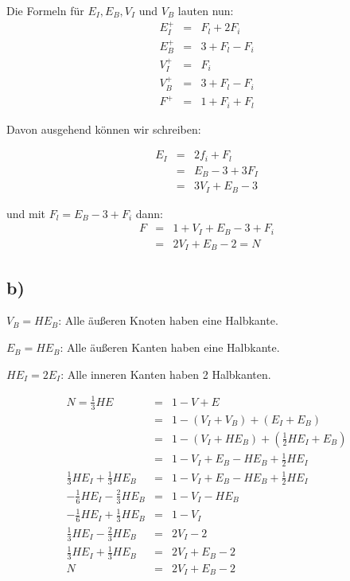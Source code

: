 Die Formeln für $E_I, E_B, V_I$ und $V_B$ lauten nun:
\begin{eqnarray}
E_{I}^+ &=& F_l + 2F_i \\
    E_{B}^+ &=& 3 + F_l - F_i  \\
    V_{I}^+ &=& F_i\\
    V_{B}^+ &=& 3 + F_l - F_i\\
    F^+ &=& 1 + F_i + F_l
\end{eqnarray}

Davon ausgehend können wir schreiben:

\begin{eqnarray}
    E_I&=& 2 f_i + F_l \\
    &=& E_B-3+3F_I \\
    &=& 3V_I + E_B-3
\end{eqnarray}

und mit $F_l = E_B - 3+F_i$ dann:
\begin{eqnarray}
    F &=& 1 + V_I + E_B-3 + F_i \\
    &=& 2 V_I + E_B-2 = N
\end{eqnarray}

\subsection*{b)}
$V_B = HE_B$: Alle äußeren Knoten haben eine Halbkante.

$E_B = HE_B$: Alle äußeren Kanten haben eine Halbkante.

$HE_I = 2E_I$: Alle inneren Kanten haben 2 Halbkanten.

\begin{eqnarray}
    N = \frac{1}{3} HE &=& 1 -V +E \\
    &=& 1 - (V_I+V_B) + (E_I + E_B) \\
    &=& 1 - (V_I+HE_B) + (\frac{1}{2}HE_I + E_B) \\
    &=& 1- V_I+E_B - HE_B + \frac{1}{2} HE_I\\
    \frac{1}{3} HE_I + \frac{1}{3} HE_B &=& 1- V_I+E_B - HE_B + \frac{1}{2} HE_I\\
    -\frac{1}{6} HE_I - \frac{2}{3} HE_B &=& 1- V_I- HE_B\\
    -\frac{1}{6} HE_I + \frac{1}{3} HE_B &=& 1- V_I \\
    \frac{1}{3} HE_I - \frac{2}{3} HE_B &=& 2 V_I - 2\\
    \frac{1}{3} HE_I + \frac{1}{3} HE_B &=& 2 V_I + E_B - 2\\
    N&=& 2 V_I + E_B - 2
\end{eqnarray}

